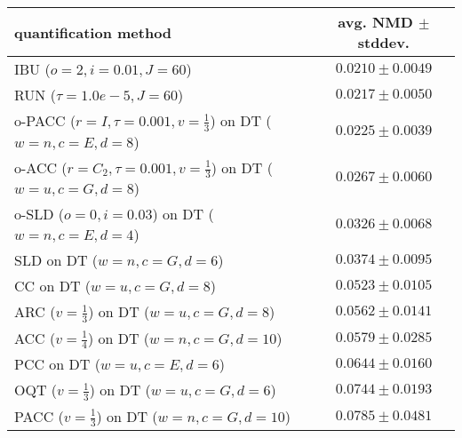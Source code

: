 \begin{tabular}{lc}
  \toprule
  quantification method & avg. NMD $\pm$ stddev. \\
  \midrule
  IBU ($o=2, i=0.01, J=60$) & $\mathbf{0.0210 \pm 0.0049}$ \\
  RUN ($\tau=1.0e-5, J=60$) & $0.0217 \pm 0.0050$ \\
  o-PACC ($r=I, \tau=0.001, v=\frac{1}{3}$) on DT ($w=n, c=E, d=8$) & $0.0225 \pm 0.0039$ \\
  o-ACC ($r=C_2, \tau=0.001, v=\frac{1}{3}$) on DT ($w=u, c=G, d=8$) & $0.0267 \pm 0.0060$ \\
  o-SLD ($o=0, i=0.03$) on DT ($w=n, c=E, d=4$) & $0.0326 \pm 0.0068$ \\
  SLD on DT ($w=n, c=G, d=6$) & $0.0374 \pm 0.0095$ \\
  CC on DT ($w=u, c=G, d=8$) & $0.0523 \pm 0.0105$ \\
  ARC ($v=\frac{1}{3}$) on DT ($w=u, c=G, d=8$) & $0.0562 \pm 0.0141$ \\
  ACC ($v=\frac{1}{4}$) on DT ($w=n, c=G, d=10$) & $0.0579 \pm 0.0285$ \\
  PCC on DT ($w=u, c=E, d=6$) & $0.0644 \pm 0.0160$ \\
  OQT ($v=\frac{1}{3}$) on DT ($w=u, c=G, d=6$) & $0.0744 \pm 0.0193$ \\
  PACC ($v=\frac{1}{3}$) on DT ($w=n, c=G, d=10$) & $0.0785 \pm 0.0481$ \\
  \bottomrule
\end{tabular}
